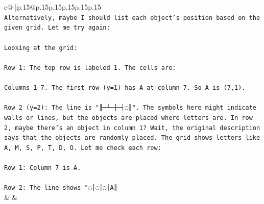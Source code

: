 \documentclass{article}
\begin{document}
{\begin{supertabular}{c@{$\;$}|p{.15\linewidth}@{}p{.15\linewidth}p{.15\linewidth}p{.15\linewidth}p{.15\linewidth}p{.15\linewidth}}
{{{\\ 
\texttt{Alternatively, maybe I should list each object's position based on the given grid. Let me try again:} \\
\\ 
\texttt{Looking at the grid:} \\
\\ 
\texttt{Row 1: The top row is labeled 1. The cells are:} \\
\\ 
\texttt{Columns 1{-}7. The first row (y=1) has A at column 7. So A is (7,1).} \\
\\ 
\texttt{Row 2 (y=2): The line is "╟─┴─┼─┤◌║". The symbols here might indicate walls or lines, but the objects are placed where letters are. In row 2, maybe there's an object in column 1? Wait, the original description says that the objects are randomly placed. The grid shows letters like A, M, S, P, T, D, O. Let me check each row:} \\
\\ 
\texttt{Row 1: Column 7 is A.} \\
\\ 
\texttt{Row 2: The line shows "◌│◌│◌│A║} \\
            }
        }
    }
    & & \\ \\


\end{supertabular}}
\end{document}
